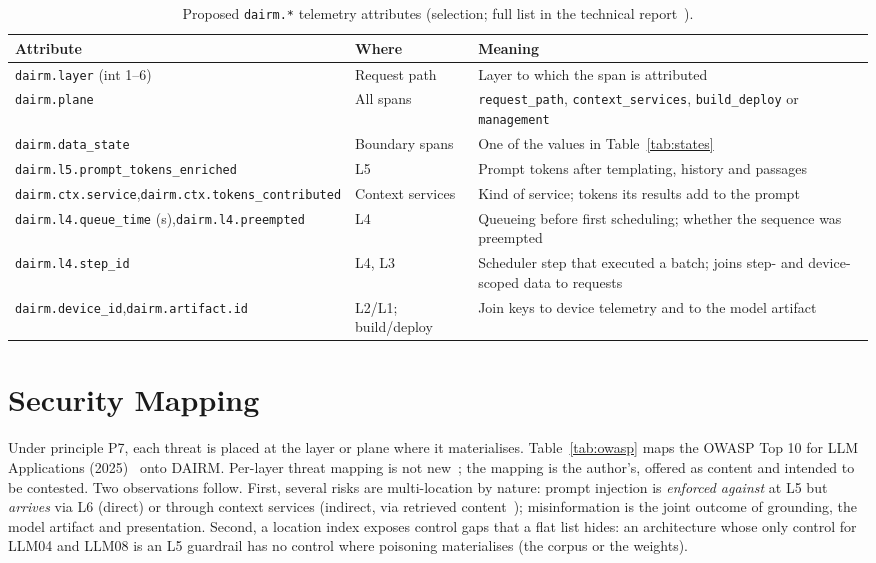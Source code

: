 \documentclass[11pt]{article}
\begin{document}
\begin{table}[!htbp]
\centering
\caption{Proposed \texttt{dairm.*} telemetry attributes (selection; full list in the technical report~\cite{bhatt2026dairm}).}
\label{tab:attrs}
\footnotesize
\begin{tabularx}{\textwidth}{@{}>{\raggedright\arraybackslash}p{5.6cm}>{\raggedright\arraybackslash}p{2.1cm}Y@{}}
\toprule
\textbf{Attribute} & \textbf{Where} & \textbf{Meaning}\\
\midrule
\texttt{dairm.layer} (int 1--6) & Request path & Layer to which the span is attributed\\
\texttt{dairm.plane} & All spans & \texttt{request\_path}, \texttt{context\_services}, \texttt{build\_deploy} or \texttt{management}\\
\texttt{dairm.data\_state} & Boundary spans & One of the values in Table~\ref{tab:states}\\
\texttt{dairm.l5.prompt\_tokens\_}\allowbreak\texttt{enriched} & L5 & Prompt tokens after templating, history and passages\\
\texttt{dairm.ctx.service},\newline \texttt{dairm.ctx.tokens\_contributed} & Context services & Kind of service; tokens its results add to the prompt\\
\texttt{dairm.l4.queue\_time} (s),\newline \texttt{dairm.l4.preempted} & L4 & Queueing before first scheduling; whether the sequence was preempted\\
\texttt{dairm.l4.step\_id} & L4, L3 & Scheduler step that executed a batch; joins step- and device-scoped data to requests\\
\texttt{dairm.device\_id},\newline \texttt{dairm.artifact.id} & L2/L1; build/deploy & Join keys to device telemetry and to the model artifact\\
\bottomrule
\end{tabularx}
\end{table}

\section{Security Mapping}
\label{sec:security}

Under principle P7, each threat is placed at the layer or plane where it materialises. Table~\ref{tab:owasp} maps the OWASP Top 10 for LLM Applications (2025)~\cite{owasp2025llm} onto DAIRM. Per-layer threat mapping is not new~\cite{huang2025maestro}; the mapping is the author's, offered as content and intended to be contested. Two observations follow. First, several risks are multi-location by nature: prompt injection is \emph{enforced against} at L5 but \emph{arrives} via L6 (direct) or through context services (indirect, via retrieved content~\cite{greshake2023indirect}); misinformation is the joint outcome of grounding, the model artifact and presentation. Second, a location index exposes control gaps that a flat list hides: an architecture whose only control for LLM04 and LLM08 is an L5 guardrail has no control where poisoning materialises (the corpus or the weights).
\end{document}
